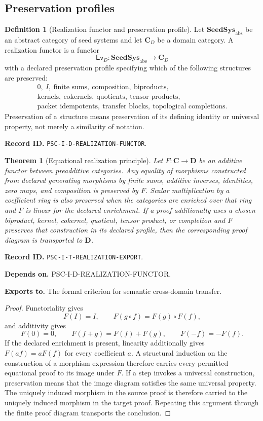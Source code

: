 \documentclass[11pt]{article}
\newtheorem{theorem}{Theorem}[section]
\theoremstyle{definition}
\newtheorem{definition}[definition]{Definition}
\theoremstyle{remark}
\newcommand{\RecordID}[1]{\par\smallskip\noindent\begingroup\footnotesize\color{PSCGray}\raggedright\textbf{Record ID.} \nolinkurl{#1}.\par\endgroup}
\newcommand{\Depends}[1]{\par\noindent\begingroup\footnotesize\color{PSCGray}\raggedright\textbf{Depends on.} #1\par\endgroup}
\newcommand{\Exports}[1]{\par\noindent\begingroup\footnotesize\color{PSCGray}\raggedright\textbf{Exports to.} #1\par\endgroup}
\begin{document}
\subsection{Preservation profiles}

\begin{definition}[Realization functor and preservation profile]
\label{def:realization-functor}
Let $\mathbf{SeedSys}_{\mathrm{abs}}$ be an abstract category of seed systems and let $\mathbf C_D$ be a domain category.  A realization functor is a functor
\[
\mathsf{Ev}_D:\mathbf{SeedSys}_{\mathrm{abs}}\longrightarrow\mathbf C_D
\]
with a declared preservation profile specifying which of the following structures are preserved:
\[
\begin{gathered}
0,\ I,\ \text{finite sums},\ \text{composition},\ \text{biproducts},\\
\text{kernels},\ \text{cokernels},\ \text{quotients},\ \text{tensor products},\\
\text{packet idempotents},\ \text{transfer blocks},\ \text{topological completions}.
\end{gathered}
\]
Preservation of a structure means preservation of its defining identity or universal property, not merely a similarity of notation.
\end{definition}
\RecordID{PSC-I-D-REALIZATION-FUNCTOR}

\begin{theorem}[Equational realization principle]
\label{thm:realization-export}
Let $F:\mathbf C\to\mathbf D$ be an additive functor between preadditive categories.  Any equality of morphisms constructed from declared generating morphisms by finite sums, additive inverses, identities, zero maps, and composition is preserved by $F$.  Scalar multiplication by a coefficient ring is also preserved when the categories are enriched over that ring and $F$ is linear for the declared enrichment.  If a proof additionally uses a chosen biproduct, kernel, cokernel, quotient, tensor product, or completion and $F$ preserves that construction in its declared profile, then the corresponding proof diagram is transported to $\mathbf D$.
\end{theorem}
\RecordID{PSC-I-T-REALIZATION-EXPORT}
\Depends{PSC-I-D-REALIZATION-FUNCTOR.}
\Exports{The formal criterion for semantic cross-domain transfer.}

\begin{proof}
Functoriality gives
\[
F(I)=I,
\qquad
F(g\circ f)=F(g)\circ F(f),
\]
and additivity gives
\[
F(0)=0,
\qquad
F(f+g)=F(f)+F(g),
\qquad
F(-f)=-F(f).
\]
If the declared enrichment is present, linearity additionally gives $F(af)=aF(f)$ for every coefficient $a$.  A structural induction on the construction of a morphism expression therefore carries every permitted equational proof to its image under $F$.  If a step invokes a universal construction, preservation means that the image diagram satisfies the same universal property.  The uniquely induced morphism in the source proof is therefore carried to the uniquely induced morphism in the target proof.  Repeating this argument through the finite proof diagram transports the conclusion.
\end{proof}
\end{document}

